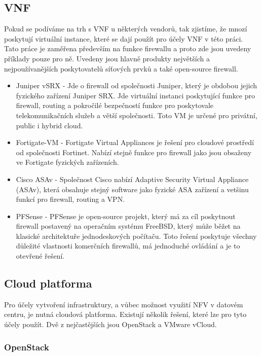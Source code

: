 \subsection{VNF}

Pokud se podíváme na trh s VNF u některých vendorů, tak zjistíme, že mnozí poskytují virtuální instance, které se dají použít pro účely VNF v této práci. Tato práce je zaměřena především na funkce firewallu a proto zde jsou uvedeny příklady pouze pro ně. Uvedeny jsou hlavně produkty největších a nejpoužívanějších poskytovatelů síťových prvků a také open-source firewall.

\begin{itemize}
\item Juniper vSRX - Jde o firewall od společnosti Juniper, který je obdobou jejich fyzického zařízení Juniper SRX. Jde virtuální instanci poskytující funkce pro firewall, routing a pokročilé bezpečností funkce pro poskytovale telekomunikačních služeb a větší společnosti. Toto VM je určené pro privátní, public i hybrid cloud. 
\item Fortigate-VM - Fortigate Virtual Appliances je řešení pro cloudové prostředí od společnosti Fortinet. Nabízí stejně funkce pro firewall jako jsou obsaženy ve Fortigate fyzických zařízeních.
\item Cisco ASAv - Společnost Cisco nabízí Adaptive Security Virtual Appliance (ASAv), která obsahuje stejný software jako fyzické ASA zařízení a vetšinu funkcí pro firewall, routing a VPN. 
\item PFSense - PFSense je open-source projekt, který má za cíl poskytnout firewall postavený na operačním systému FreeBSD, který může běžet na klasické architektuře jednodeskových počítaču. Toto řešení poskytuje všechny důležité vlastnosti komerčních firewallů, má jednoduché ovládání a je to otevřené řešení.
\end{itemize} 

\subsection{Cloud platforma}

Pro účely vytvoření infrastruktury, a vůbec možnost využití NFV v datovém centru, je nutná cloudová platforma. Existují několik řešení, které lze pro tyto účely použít. Dvě z nejčastějších jsou OpenStack a VMware vCloud.


\subsubsection{OpenStack}


